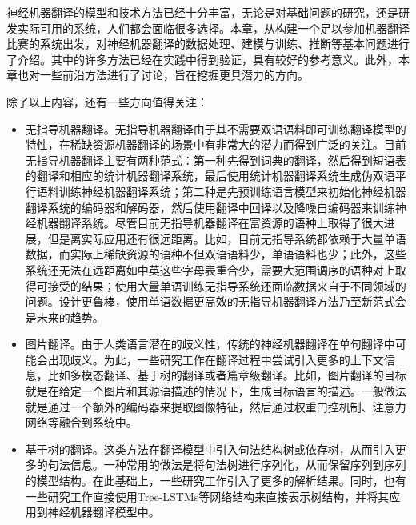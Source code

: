 \parinterval 神经机器翻译的模型和技术方法已经十分丰富，无论是对基础问题的研究，还是研发实际可用的系统，人们都会面临很多选择。本章，从构建一个足以参加机器翻译比赛的系统出发，对神经机器翻译的数据处理、建模与训练、推断等基本问题进行了介绍。其中的许多方法已经在实践中得到验证，具有较好的参考意义。此外，本章也对一些前沿方法进行了讨论，旨在挖掘更具潜力的方向。

\parinterval 除了以上内容，还有一些方向值得关注：

\begin{itemize}
\vspace{0.5em}
\item 无指导机器翻译。无指导机器翻译由于其不需要双语语料即可训练翻译模型的特性，在稀缺资源机器翻译的场景中有非常大的潜力而得到广泛的关注。目前无指导机器翻译主要有两种范式：第一种先得到词典的翻译，然后得到短语表的翻译和相应的统计机器翻译系统，最后使用统计机器翻译系统生成伪双语平行语料训练神经机器翻译系统\cite{DBLP:conf/acl/ArtetxeLA19}；第二种是先预训练语言模型来初始化神经机器翻译系统的编码器和解码器，然后使用翻译中回译以及降噪自编码器来训练神经机器翻译系统\cite{lample2019cross}。尽管目前无指导机器翻译在富资源的语种上取得了很大进展，但是离实际应用还有很远距离。比如，目前无指导系统都依赖于大量单语数据，而实际上稀缺资源的语种不但双语语料少，单语语料也少；此外，这些系统还无法在远距离如中英这些字母表重合少，需要大范围调序的语种对上取得可接受的结果；使用大量单语训练无指导系统还面临数据来自于不同领域的问题\cite{DBLP:journals/corr/abs-2004-05516}。设计更鲁棒，使用单语数据更高效的无指导机器翻译方法乃至新范式会是未来的趋势。
\vspace{0.5em}
\item 图片翻译。由于人类语言潜在的歧义性，传统的神经机器翻译在单句翻译中可能会出现歧义。为此，一些研究工作在翻译过程中尝试引入更多的上下文信息，比如多模态翻译、基于树的翻译或者篇章级翻译。比如，图片翻译的目标就是在给定一个图片和其源语描述的情况下，生成目标语言的描述。一般做法就是通过一个额外的编码器来提取图像特征\cite{DBLP:journals/corr/ElliottFH15,DBLP:conf/acl/HitschlerSR16}，然后通过权重门控机制、注意力网络等融合到系统中\cite{DBLP:conf/wmt/HuangLSOD16}。

\vspace{0.5em}
\item 基于树的翻译。这类方法在翻译模型中引入句法结构树或依存树，从而引入更多的句法信息。一种常用的做法是将句法树进行序列化，从而保留序列到序列的模型结构\cite{DBLP:conf/emnlp/CurreyH18,DBLP:conf/acl/SaundersSGB18}。在此基础上，一些研究工作引入了更多的解析结果\cite{DBLP:conf/acl/SumitaUZTM18,DBLP:conf/coling/ZaremoodiH18}。同时，也有一些研究工作直接使用Tree-LSTMs等网络结构\cite{DBLP:conf/acl/TaiSM15,DBLP:conf/iclr/ShenTSC19}来直接表示树结构，并将其应用到神经机器翻译模型中\cite{DBLP:conf/acl/EriguchiHT16,Yang2017TowardsBH,DBLP:conf/acl/ChenHCC17}。


\end{itemize}
